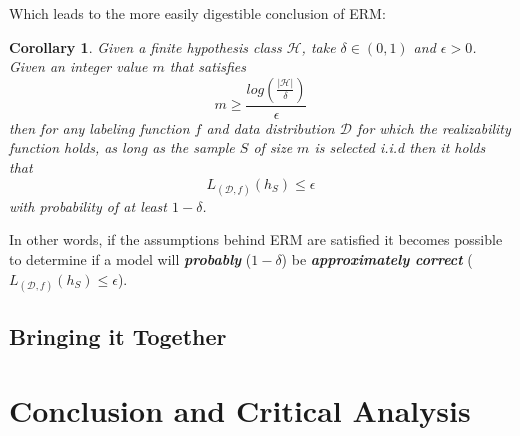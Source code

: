 \documentclass[10pt,conference]{IEEEtran}
\def\dist{\mathcal{D}}
\def\hypspace{\mathcal{H}}
\newtheorem{corollary}{Corollary}
\begin{document}
    Which leads to the more easily digestible conclusion of ERM:

    \begin{corollary}
      Given a finite hypothesis class $\hypspace$, take $\delta \in (0, 1)$ and $\epsilon > 0$. Given an integer value $m$ that satisfies 
      \[m \geq \frac{log(\frac{|\hypspace|}{\delta})}{\epsilon}\] then for any labeling function $f$ and data distribution $\dist$ for which the realizability function holds, as long as the sample $S$ of size $m$ is selected i.i.d then it holds that \[L_{(\dist, f)}(h_S) \leq \epsilon\] with probability of at least $1 - \delta$\cite{shais}.
    \end{corollary}

    In other words, if the assumptions behind ERM are satisfied it becomes possible to determine if a model will \emph{\textbf{probably}} ($1-\delta$) be \emph{\textbf{approximately correct}} ($L_{(\dist, f)}(h_S) \leq \epsilon$)\cite{shais}.

  \subsection{Bringing it Together}
  

\section{Conclusion and Critical Analysis}
  
\nocite{*}




\vspace{12pt}
\end{document}

